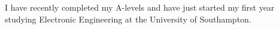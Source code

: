 
I have recently completed my A-levels and have just started my first year studying Electronic Engineering at the University of Southampton.
